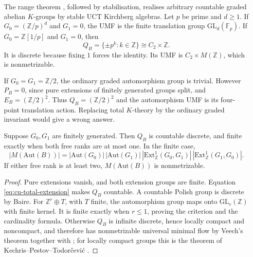 \begin{example}\label{ex:cu-example-1}
The range theorem \cite[Theorem 4.2.5]{Phillips2000}, followed by stabilisation,
realises arbitrary countable graded abelian $K$-groups by stable UCT
Kirchberg algebras. Let $p$ be prime and $d\geq1$. If $G_0=(\mathbb{Z}/p)^d$
and $G_1=0$, the UMF is the finite translation group $\mathrm{GL}_d(\mathbb{F}_p)$. If $G_0=\mathbb{Z}[1/p]$ and $G_1=0$, then 
\begin{equation*}
Q_B=\{\pm p^k:k\in\mathbb{Z}\}\cong C_2\times\mathbb{Z}.
\end{equation*}
It is discrete because fixing $1$ forces the identity. Its UMF is $C_2\times
M(\mathbb{Z})$, which is nonmetrizable.
\end{example}

\begin{example}\label{ex:cu-coefficient}
 If $G_0=G_1=\mathbb{Z}/2$, the ordinary graded
automorphism group is trivial. However $P_B=0$, since pure extensions of
finitely generated groups split, and $E_B=(\mathbb{Z}/2)^2$. Thus $Q_B=(\mathbb{Z}/2)^2$ and the automorphism UMF is its four-point translation
action. Replacing total $K$-theory by the ordinary graded invariant would
give a wrong answer.
\end{example}

\begin{proposition}\label{prop:cu-finite-k}
 Suppose $G_0,G_1$ are finitely generated. Then $Q_B$
is countable discrete, and finite exactly when both free ranks are at most
one. In the finite case, 
\begin{equation*}
|M(\mathrm{Aut}(B))| =|\mathrm{Aut}(G_0)|\,|\mathrm{Aut}(G_1)|\, |\mathrm{Ext}^1_\mathbb{Z}(G_0,G_1)|\,|\mathrm{Ext}^1_\mathbb{Z}(G_1,G_0)|.
\end{equation*}
If either free rank is at least two, $M(\mathrm{Aut}(B))$ is nonmetrizable.
\end{proposition}

\begin{proof}
Pure extensions vanish, and both extension groups are finite. Equation \eqref{eq:cu-total-extension} makes $Q_B$ countable. A countable Polish group
is discrete by Baire. For $\mathbb{Z}^r\oplus T$, with $T$ finite, the
automorphism group maps onto $\mathrm{GL}_r(\mathbb{Z})$ with finite kernel.
It is finite exactly when $r\leq1$, proving the criterion and the
cardinality formula. Otherwise $Q_B$ is infinite discrete, hence locally
compact and noncompact, and therefore has nonmetrizable universal minimal
flow by Veech's theorem together with \cite[Corollary 3.9 and the remark
following it]{BYMT2017}; for locally compact groups this is the theorem of
Kechris--Pestov--Todor\v{c}evi\'c \cite{KPT2005}.
\end{proof}

